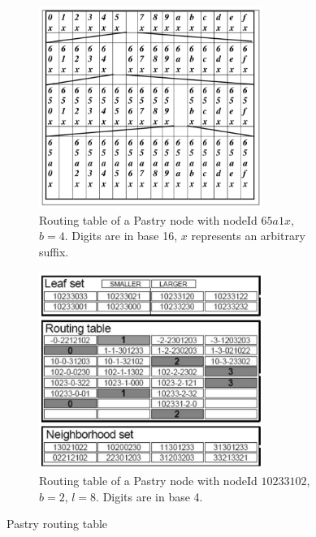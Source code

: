 \documentclass[a4paper,12pt]{article}
\begin{document}
\begin{figure}[t]
      \centering
      \begin{subfigure}{.45\textwidth}
        \centering
        \includegraphics[width=0.8\textwidth]{img/routing-table-1}
        \caption{\label{fig:routing-table-1}Routing table of a Pastry node with nodeId $65a1x$, $b=4$. Digits are in base 16, $x$ represents an arbitrary suffix.}
      \end{subfigure}\hfill%
      \begin{subfigure}{.45\textwidth}
        \centering
        \includegraphics[width=0.8\textwidth]{img/routing-table-2}
        \caption{\label{fig:routing-table-2}Routing table of a Pastry node with nodeId $10233102$, $b=2$, $l=8$. Digits are in base 4.}
      \end{subfigure}
      \caption{Pastry routing table}
    \end{figure}
\end{document}
